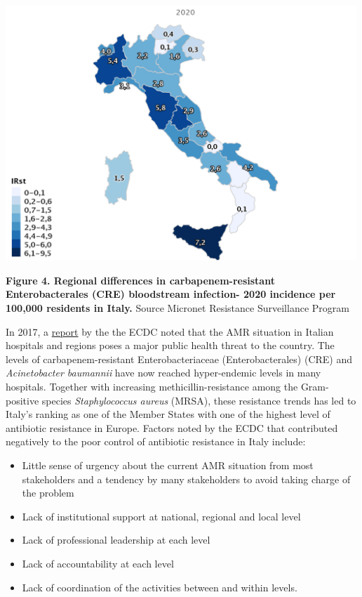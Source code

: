 \documentclass[
]{book}
\providecommand{\tightlist}{%
  \setlength{\itemsep}{0pt}\setlength{\parskip}{0pt}}
\begin{document}
\includegraphics[width=5.20833in,height=\textheight]{images/Italia_CRE.png}

\textbf{Figure 4. Regional differences in carbapenem-resistant Enterobacterales (CRE) bloodstream infection- 2020 incidence per 100,000 residents in Italy.} Source Micronet Resistance Surveillance Program

In 2017, a \href{https://www.ecdc.europa.eu/en/publications-data/ecdc-country-visit-italy-discuss-antimicrobial-resistance-issues}{report} by the the ECDC noted that the AMR situation in Italian hospitals and regions poses a major public health threat to the country. The levels of carbapenem-resistant Enterobacteriaceae (Enterobacterales) (CRE) and \emph{Acinetobacter baumannii} have now reached hyper-endemic levels in many hospitals. Together with increasing methicillin-resistance among the Gram-positive species \emph{Staphylococcus aureus} (MRSA), these resistance trends has led to Italy's ranking as one of the Member States with one of the highest level of antibiotic resistance in Europe. Factors noted by the ECDC that contributed negatively to the poor control of antibiotic resistance in Italy include:

\begin{itemize}
\tightlist
\item
  Little sense of urgency about the current AMR situation from most stakeholders and a tendency by many stakeholders to avoid taking charge of the problem
\item
  Lack of institutional support at national, regional and local level
\item
  Lack of professional leadership at each level
\item
  Lack of accountability at each level
\item
  Lack of coordination of the activities between and within levels.
\end{itemize}
\end{document}
